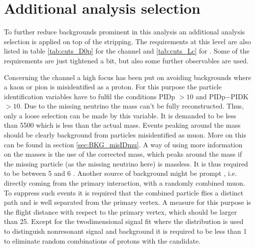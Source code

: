 \section{Additional analysis selection}
To further reduce backgrounds prominent in this analysis an additional analysis selection is applied on top of the stripping.
The requirements at this level are also listed in table \ref{tab:cuts_D0p} for the \LbToDpmunuX channel and \ref{tab:cuts_Lc} for \LbToLcmunu.
Some of the requirements are just tightened a bit, but also some further observables are used.

Concerning the \LbToDpmunu channel a high focus has been put on avoiding backgrounds where a kaon or pion is misidentified as a proton. 
For this purpose the particle identification variables have to fulfil the conditions PIDp $> 10$ and PIDp$-$PIDK $> 10$.
Due to the missing neutrino the \Lb mass can't be fully reconstructed.
Thus, only a loose selection can be made by this variable.
It is demanded to be less than 5500 \mev which is less than the actual \Lb mass.
Events peaking around the \Lb mass should be clearly background from particles misidentified as muon.
More on this can be found in section \ref{sec:BKG_misIDmu}.
A way of using more information on the masses is the use of the corrected \Lb mass, which peaks around the \Lb mass if the missing particle (as the missing neutrino here) is massless.
It is thus required to be between 5 and 6 \gev.
Another source of background might be prompt \Dz, i.e. \Dz directly coming from the primary interaction, with a randomly combined muon.
To suppress such events it is required that the combined \Dz\mun particle flies a distinct path and is well separated from the primary vertex.
A measure for this purpose is the flight distance \chisq with respect to the primary vertex, which should be larger than 25.
Except for the twodimensional signal fit where the \logIP distribution is used to distinguish nonresonant signal and background it is required to be less than 1 to eliminate random combinations of protons with the \Dz\mun candidate.
